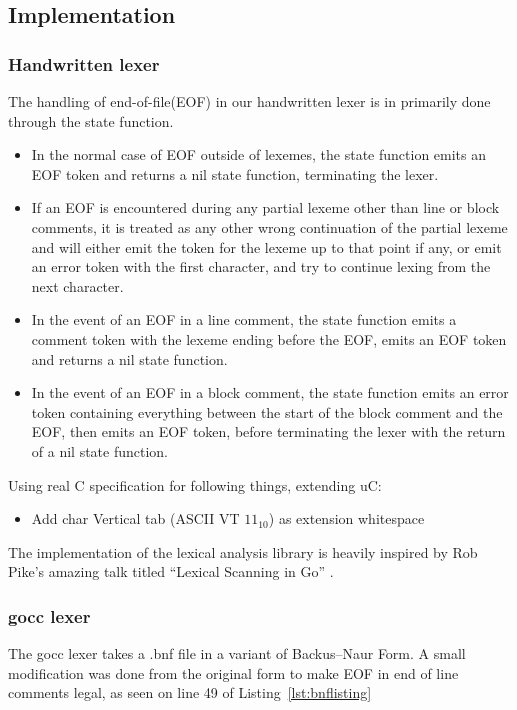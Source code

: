 \subsection{Implementation}

\subsubsection{Handwritten lexer}
The handling of end-of-file(EOF) in our handwritten lexer is in primarily done through the state function.
\begin{itemize}

\item In the normal case of EOF outside of lexemes, the state function emits an EOF token and returns a nil state function, terminating the lexer.

\item If an EOF is encountered during any partial lexeme other than line or block comments, it is treated as any other wrong continuation of the partial lexeme and will either emit the token for the lexeme up to that point if any, or emit an error token with the first character, and try to continue lexing from the next character.

\item In the event of an EOF in a line comment, the state function emits a comment token with the lexeme ending before the EOF, emits an EOF token and returns a nil state function.

\item In the event of an EOF in a block comment, the state function emits an error token containing everything between the start of the block comment and the EOF, then emits an EOF token, before terminating the lexer with the return of a nil state function.

\end{itemize}

Using real C specification for following things, extending uC:
\begin{itemize}
	\item Add char Vertical tab (ASCII VT $11_{10}$) as extension whitespace
\end{itemize}



The implementation of the lexical analysis library is heavily inspired by Rob Pike's amazing talk titled ``Lexical Scanning in Go'' \cite{lexical_scanning_in_go}.


\subsubsection{gocc lexer}
The gocc lexer takes a .bnf file in a variant of Backus–Naur Form.
A small modification was done from the original form to make EOF in end of line comments legal, as seen on line 49 of Listing~\ref{lst:bnflisting}



